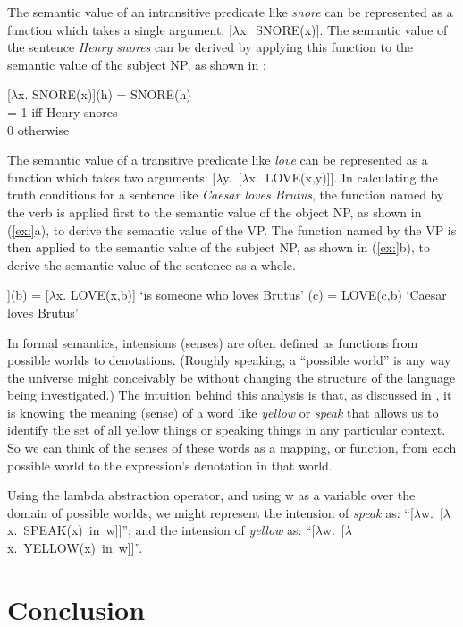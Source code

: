 The semantic value of an intransitive predicate like \textit{snore} can be represented as a function which takes a single argument: [$\lambda $x.~SNORE(x)]. The semantic value of the sentence \textit{Henry snores} can be derived by applying this function to the semantic value of the subject NP, as shown in :


\ea
{}[$\lambda $x. SNORE(x)](h)  =  SNORE(h)\\
  =  1 iff Henry snores\\
    0 otherwise
\z


The semantic value of a transitive predicate like \textit{love} can be represented as a function which takes two arguments: [$\lambda $y.~[$\lambda $x.~LOVE(x,y)]]. In calculating the truth conditions for a sentence like \textit{Caesar loves Brutus}, the function named by the verb is applied first to the semantic value of the object NP, as shown in (\ref{ex:}a), to derive the semantic value of the VP. The function named by the VP is then applied to the semantic value of the subject NP, as shown in (\ref{ex:}b), to derive the semantic value of the sentence as a whole.


\ea
\ea  [$\lambda $y. [$\lambda $x. LOVE(x,y)]](b) = [$\lambda $x. LOVE(x,b)] ‘is someone who loves Brutus’
(c) =  LOVE(c,b) ‘Caesar loves Brutus’
\z \z


In formal semantics, intensions (senses) are often defined as functions from possible worlds to denotations. (Roughly speaking, a “possible world” is any way the universe might conceivably be without changing the structure of the language being investigated.) The intuition behind this analysis is that, as discussed in , it is knowing the meaning (sense) of a word like \textit{yellow} or \textit{speak} that allows us to identify the set of all yellow things or speaking things in any particular context. So we can think of the senses of these words as a mapping, or function, from each possible world to the expression’s denotation in that world.



Using the lambda abstraction operator, and using w as a variable over the domain of possible worlds, we might represent the intension of \textit{speak} as: “[$\lambda $w.~[$\lambda $x.~SPEAK(x)~in~w]]”; and the intension of \textit{yellow} as: “[$\lambda $w.~[$\lambda $x.~YELLOW(x)~in~w]]”.


\section{Conclusion}\label{sec:15.7}

